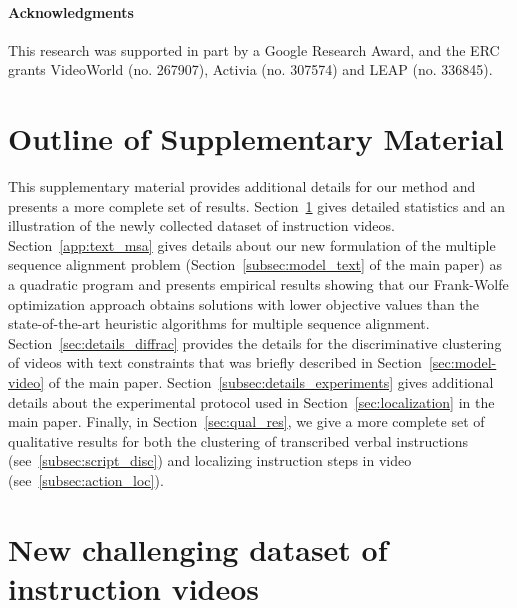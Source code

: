 \documentclass[10pt,twocolumn,letterpaper]{article}
\begin{document}
%
%
%
%
%
%
%
%
%
%
%
%
%
%
%


\small{
\paragraph{Acknowledgments}
This research was supported in part by a Google Research Award, and the ERC grants VideoWorld (no. 267907), Activia (no. 307574) and LEAP (no. 336845).
}
%
%
%
%

%

{\small


}

%
%
%
%
%

%
%
%
%
%
%





%

\clearpage

\appendix

%
\section*{Outline of Supplementary Material}
%
\label{app:intro}
This supplementary material provides additional details for our method and presents a more complete set of results.
%
Section~\ref{app:dataset} gives detailed statistics and an illustration of the newly collected dataset of instruction videos.
Section~\ref{app:text_msa} gives details about our new formulation of the multiple sequence alignment problem (Section~\ref{subsec:model_text} of the main paper) as a quadratic program and presents empirical results showing that our Frank-Wolfe optimization approach obtains solutions with lower objective values than the state-of-the-art heuristic algorithms for multiple sequence alignment. 
Section~\ref{sec:details_diffrac} provides the details for the discriminative clustering of videos with text constraints that was briefly described in Section~\ref{sec:model-video} of the main paper.
Section~\ref{subsec:details_experiments} gives additional details about the experimental protocol used in Section~\ref{sec:localization} in the main paper.
Finally, in Section~\ref{sec:qual_res}, we give a more complete set of qualitative results for both the clustering of transcribed verbal instructions (see~\ref{subsec:script_disc}) and localizing instruction steps in video (see~\ref{subsec:action_loc}).

%
%
%

%
%

%
\section{New challenging dataset of instruction videos}
\label{app:dataset}
%
\end{document}
